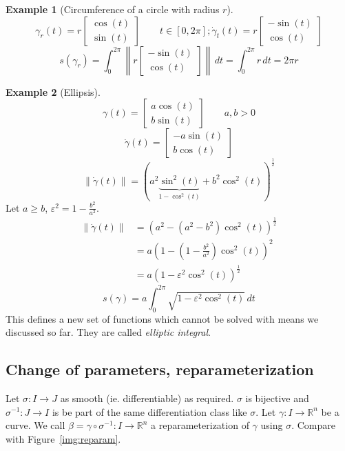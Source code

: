 \documentclass[a4paper,landscape,twocolumn]{article}
\theoremstyle{definition}
\newtheorem{ex}{Example}
\newcommand\norm[1]{\left\|#1\right\|}
\begin{document}
\begin{ex}[Circumference of a circle with radius $r$]
  \[
    \gamma_r(t) = r \begin{bmatrix}
      \cos(t) \\
      \sin(t)
    \end{bmatrix}
    \qquad t \in [0, 2\pi];
    \dot\gamma_t(t) = r \begin{bmatrix}
      -\sin(t) \\
      \cos(t)
    \end{bmatrix}
  \] \[
    s(\gamma_r) = \int_0^{2\pi} \norm{r \begin{bmatrix} - \sin(t) \\ \cos(t) \end{bmatrix}} \, dt
    = \int_0^{2\pi} r \, dt = 2\pi r
  \]
\end{ex}

\begin{ex}[Ellipsis]
  \[
    \gamma(t) = \begin{bmatrix}
      a \cos(t) \\
      b \sin(t)
    \end{bmatrix} \qquad a,b > 0
  \] \[
    \dot\gamma(t) = \begin{bmatrix}
      -a \sin(t) \\
      b \cos(t)
    \end{bmatrix}
  \] \[
    \norm{\dot\gamma(t)} = (a^2 \underbrace{\sin^2(t)}_{1 - \cos^2(t)} + b^2 \cos^2 (t))^{\frac12}
  \]
  Let $a \geq b$, $\varepsilon^2 = 1 - \frac{b^2}{a^2}$.
  \begin{align*}
    \norm{\dot\gamma(t)} &= (a^2 - (a^2 - b^2) \cos^2(t))^{\frac12} \\
      &= a \left(1 - \left(1 - \frac{b^2}{a^2}\right) \cos^2(t)\right)^2 \\
      &= a \left(1 - \varepsilon^2 \cos^2(t)\right)^{\frac12}
  \end{align*}
  \[ s(\gamma) = a \int_0^{2\pi} \sqrt{1 - \varepsilon^2 \cos^2(t)} \, dt \]
  This defines a new set of functions which cannot be solved with means we discussed so far.
  They are called \emph{elliptic integral}.
\end{ex}

\subsection{Change of parameters, reparameterization}
%
Let $\sigma: I \to J$ as smooth (ie. differentiable) as required.
$\sigma$ is bijective and $\sigma^{-1}: J \to I$ is be part
of the same differentiation class like $\sigma$.
Let $\gamma: I \to \mathbb R^n$ be a curve. We call
$\beta = \gamma \circ \sigma^{-1}: I \to \mathbb R^n$ a reparameterization
of $\gamma$ using $\sigma$. Compare with Figure~\ref{img:reparam}.
\end{document}
